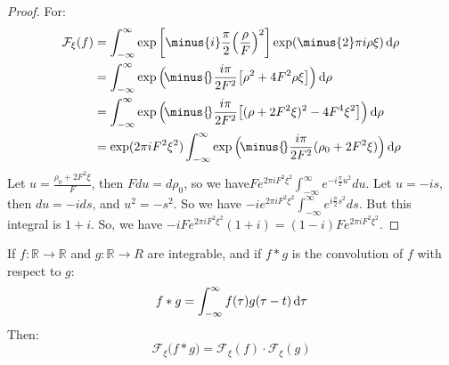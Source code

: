     \begin{proof}
    For:
    \begin{align}
        \mathcal{F}_{\xi}(f)
        &=\int_{-\infty}^{\infty}
            \exp\bigg[
                \minus{i}\frac{\pi}{2}
                \Big(\frac{\rho}{F}\Big)^2
            \bigg]
            \exp(\minus{2}\pi{i}\rho\xi)\diff{\rho}\\
        &=\int_{-\infty}^{\infty}
            \exp\Big(
                {\!}\minus{\!}\frac{i\pi}{2F^{2}}
                \big[
                    {\rho}^{2}+4F^{2}\rho\xi
                \big]\Big)\diff{\rho}\\
        &=\int_{-\infty}^{\infty}
            \exp\Big(
                {\!}\minus{\!}\frac{i\pi}{2F^{2}}
                \big[
                    (\rho+2F^{2}\xi)^2-4F^{4}\xi^{2}
                \big]
            \Big)\diff{\rho}\\
        &=\exp(2\pi{i}F^{2}\xi^{2})\int_{-\infty}^{\infty}
            \exp\Big(
                {\!}\minus{\!}\frac{i\pi}{2F^2}
                (\rho_0+2F^2\xi)
            \Big)\diff{\rho}
    \end{align}
    Let $u = \frac{\rho_0 + 2F^2 \xi}{F}$, then
    $Fdu = d\rho_0$, so we have$Fe^{2\pi i F^2 \xi^2} \int_{-\infty}^{\infty} e^{-i\frac{\pi}{2}u^2}du$.
    Let $u = -is$, then $du = -ids$, and $u^2 = -s^2$. So
    we have $-i e^{2\pi i F^2 \xi^2}\int_{-\infty}^{\infty} e^{i\frac{\pi}{2}s^2}ds$.
    But this integral is $1+i$. So, we have
    $-iFe^{2\pi iF^2\xi^2}(1+i)=(1-i)Fe^{2\pi iF^2 \xi^2}$.
    \end{proof}
    \begin{theorem}
        If $f:\mathbb{R}\rightarrow\mathbb{R}$ and
        $g:\mathbb{R}\rightarrow{R}$ are integrable,
        and if $f*g$ is the convolution of $f$ with
        respect to $g$:
        \begin{equation}
            f*g=\int_{-\infty}^{\infty}
                f(\tau)g(\tau-t)\mathop{}\!\mathrm{d}{\tau}
        \end{equation}
        Then:
        \begin{equation}
            \mathcal{F}_{\xi}\big(f*g\big)
            =\mathcal{F}_{\xi}(f)\cdot\mathcal{F}_{\xi}(g)
        \end{equation}
    \end{theorem}
